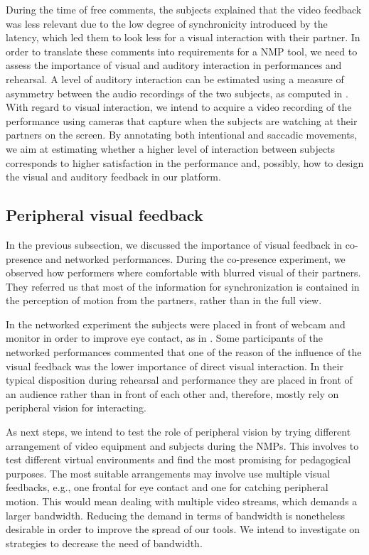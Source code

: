 \documentclass[conference]{IEEEtran}
\begin{document}
During the time of free comments, the subjects explained that the video feedback was less relevant due to the low degree of synchronicity introduced by the latency, which led them to look less for a visual interaction with their partner. In order to translate these comments into requirements for a NMP tool, we need to assess the importance of visual and auditory interaction in performances and rehearsal. A level of auditory interaction can be estimated using a measure of asymmetry between the audio recordings of the two subjects, as computed in \cite{Chafe3}. With regard to visual interaction, we intend to acquire a video recording of the performance using cameras that capture when the subjects are watching at their partners on the screen. By annotating both intentional and saccadic movements, we aim at estimating whether a higher level of interaction between subjects corresponds to higher satisfaction in the performance and, possibly, how to design the visual and auditory feedback in our platform.
 
\subsection{Peripheral visual feedback}
In the previous subsection, we discussed the importance of visual feedback in co-presence and networked performances. During the co-presence experiment, we observed how performers where comfortable with blurred visual of their partners. They referred us that most of the information for synchronization is contained in the perception of motion from the partners, rather than in the full view.

In the networked experiment the subjects were placed in front of webcam and monitor in order to improve eye contact, as in \cite{duffy2017new}. Some participants of the networked performances commented that one of the reason of the influence of the visual feedback was the lower importance of direct visual interaction. In their typical disposition during rehearsal and performance they are placed in front of an audience rather than in front of each other and, therefore, mostly rely on peripheral vision for interacting.

As next steps, we intend to test the role of peripheral vision by trying different arrangement of video equipment and subjects during the NMPs. This involves to test different virtual environments and find the most promising for pedagogical purposes.  The most suitable arrangements may involve use multiple visual feedbacks, e.g., one frontal for eye contact and one for catching peripheral motion. This would mean dealing with multiple video streams, which demands a larger bandwidth. Reducing the demand in terms of bandwidth is nonetheless desirable in order to improve the spread of our tools. We intend to investigate on strategies to decrease the need of bandwidth.
\end{document}
